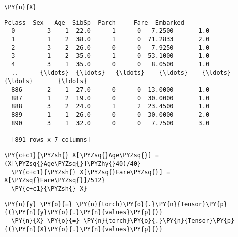       \begin{tcolorbox}[breakable, size=fbox, boxrule=1pt, pad at break*=1mm,colback=cellbackground, colframe=cellborder]
  \begin{Verbatim}[commandchars=\\\{\}]
  \PY{n}{X}
  \end{Verbatim}
  \end{tcolorbox}

              \begin{tcolorbox}[breakable, size=fbox, boxrule=.5pt, pad at break*=1mm, opacityfill=0]
  \begin{Verbatim}[commandchars=\\\{\}]
       Pclass  Sex   Age  SibSp  Parch     Fare  Embarked
  0         3    1  22.0      1      0   7.2500       1.0
  1         1    2  38.0      1      0  71.2833       2.0
  2         3    2  26.0      0      0   7.9250       1.0
  3         1    2  35.0      1      0  53.1000       1.0
  4         3    1  35.0      0      0   8.0500       1.0
  ..      {\ldots}  {\ldots}   {\ldots}    {\ldots}    {\ldots}      {\ldots}       {\ldots}
  886       2    1  27.0      0      0  13.0000       1.0
  887       1    2  19.0      0      0  30.0000       1.0
  888       3    2  24.0      1      2  23.4500       1.0
  889       1    1  26.0      0      0  30.0000       2.0
  890       3    1  32.0      0      0   7.7500       3.0

  [891 rows x 7 columns]
  \end{Verbatim}
  \end{tcolorbox}
          
      \begin{tcolorbox}[breakable, size=fbox, boxrule=1pt, pad at break*=1mm,colback=cellbackground, colframe=cellborder]
  \begin{Verbatim}[commandchars=\\\{\}]
  \PY{c+c1}{\PYZsh{} X[\PYZsq{}Age\PYZsq{}] = (X[\PYZsq{}Age\PYZsq{}]\PYZhy{}40)/40}
  \PY{c+c1}{\PYZsh{} X[\PYZsq{}Fare\PYZsq{}] = X[\PYZsq{}Fare\PYZsq{}]/512}
  \PY{c+c1}{\PYZsh{} X}
  \end{Verbatim}
  \end{tcolorbox}

      \begin{tcolorbox}[breakable, size=fbox, boxrule=1pt, pad at break*=1mm,colback=cellbackground, colframe=cellborder]
  \begin{Verbatim}[commandchars=\\\{\}]
  \PY{n}{y} \PY{o}{=} \PY{n}{torch}\PY{o}{.}\PY{n}{Tensor}\PY{p}{(}\PY{n}{y}\PY{o}{.}\PY{n}{values}\PY{p}{)}
  \PY{n}{X} \PY{o}{=} \PY{n}{torch}\PY{o}{.}\PY{n}{Tensor}\PY{p}{(}\PY{n}{X}\PY{o}{.}\PY{n}{values}\PY{p}{)}
  \end{Verbatim}
  \end{tcolorbox}

